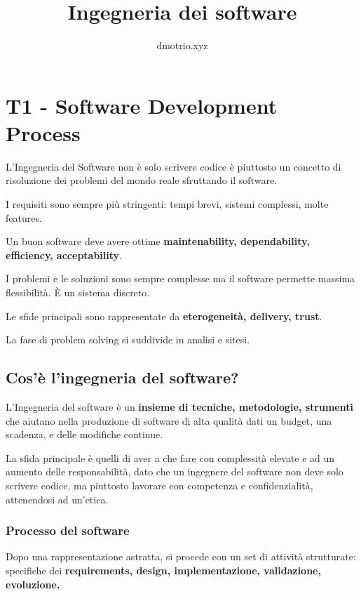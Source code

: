 \documentclass{article}
\begin{document}
    \author{dmotrio.xyz}
    \title{Ingegneria dei software}

    \maketitle
    \tableofcontents

    \listoffigures
    \listoftables

    \newpage

\section{T1 - Software Development Process}
L'Ingegneria del Software non è solo scrivere codice è piuttosto un concetto 
di risoluzione dei problemi del mondo reale sfruttando il software.

I requisiti sono sempre più stringenti: tempi brevi, sistemi complessi, molte features.

Un buon software deve avere ottime \textbf{maintenability, dependability, efficiency, acceptability}.

I problemi e le soluzioni sono sempre complesse ma il software permette massima flessibilità.
È un sistema discreto.

Le sfide principali sono rappresentate da \textbf{eterogeneità, delivery, trust}.

La fase di problem solving si suddivide in analisi e sitesi.

\subsection{Cos'è l'ingegneria del software?}
L'Ingegneria del software è un \textbf{insieme di tecniche, metodologie, strumenti} che aiutano
nella produzione di software di alta qualità dati un budget, una scadenza, e delle modifiche continue.

La sfida principale è quelli di aver a che fare con complessità elevate e ad un aumento delle
responsabilità, dato che un ingegnere del software non deve solo scrivere codice, ma piuttosto lavorare
con competenza e confidenzialità, attenendosi ad un'etica.

\subsubsection{Processo del software}
Dopo una rappresentazione astratta, si procede con un set di attività strutturate:
specifiche dei \textbf{requirements, design, implementazione, validazione, evoluzione.}
\end{document}
